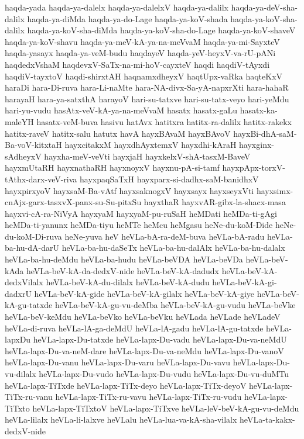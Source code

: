 {haqda-yada
haqda-ya-dalelx
haqda-ya-dalelxV
haqda-ya-dalilx
haqda-ya-deV-sha-dalilx
haqda-ya-diMda
haqda-ya-do-Lage
haqda-ya-koV-shada
haqda-ya-koV-sha-dalilx
haqda-ya-koV-sha-diMda
haqda-ya-koV-sha-do-Lage
haqda-ya-koV-shaveV
haqda-ya-koV-shavu
haqda-ya-meV-kA-ya-na-meVvaM
haqda-ya-mi-SayxteV
haqda-yasayx
haqda-ya-veM-budu
haqdayeV
haqda-yeV-heyxV-va-rU-pANi
haqdedxVshaM
haqdevxV-SaTx-na-mi-hoV-cayxteV
haqdi
haqdiV-tAyxdi
haqdiV-tayxtoV
haqdi-shirxtAH
haqnamxdheyxV
haqtUpx-vaRka
haqteKxV
haraDi
hara-Di-ruva
hara-Li-naMte
hara-NA-divx-Sa-yA-napxrXti
hara-hahaR
harayaH
hara-ya-satxthA
harayoV
hari-su-tatxve
hari-su-tatx-veyo
hari-yeMdu
hari-yu-vudu
hasAtx-veV-kA-ya-na-meVvaM
hasatx
hasatx-gaLu
hasatx-ka-maleYH
hasatx-veM-buva
hasivu
hatAvx
hatitxra
hatitx-ra-dalilx
hatitx-rakekx
hatitx-raveV
hatitx-salu
hatutx
havA
hayxBAvaM
hayxBAvoV
hayxBi-dhA-saM-Ba-voV-kitxtaH
hayxcitakxM
hayxdhAyxtemxV
hayxdhi-kAraH
hayxginx-sAdheyxV
hayxha-meV-veVti
hayxjaH
hayxkelxV-shA-tasxM-BaveV
hayxmUtaRH
hayxnathaRH
hayxnoyxV
hayxnu-pA-si-tamf
hayxpApx-torxV-tAthx-darx-veV-riva
hayxpaqSaTxH
hayxparx-si-dadhx-saM-banidhxV
hayxpirxyoV
hayxsaM-Ba-vAtf
hayxsaknogxV
hayxsayx
hayxseyxVti
hayxsimx-cnAjx-garx-tasxvX-panx-su-Su-pitxSu
hayxthaR
hayxvAR-gibx-la-shacx-masa
hayxvi-cA-ra-NiVyA
hayxyaM
hayxyaM-pu-ruSaH
heMDati
heMDa-ti-gAgi
heMDa-ti-yanunx
heMDa-tiyu
heMTe
heMcu
heMgasu
heNe-du-koM-Dide
heNe-du-koM-Di-ruva
heNe-yuva
heV
heVLa-bA-ra-deM-buva
heVLa-bA-radu
heVLa-ba-hu-dA-darU
heVLa-ba-hu-daSeTx
heVLa-ba-hu-dalAlx
heVLa-ba-hu-dalalx
heVLa-ba-hu-deMdu
heVLa-ba-hudu
heVLa-beVDA
heVLa-beVDa
heVLa-beV-kAda
heVLa-beV-kA-da-dedxV-nide
heVLa-beV-kA-dadudx
heVLa-beV-kA-dedxVilalx
heVLa-beV-kA-du-dilalx
heVLa-beV-kA-dudu
heVLa-beV-kA-gi-dadxrU
heVLa-beV-kA-gide
heVLa-beV-kA-gilalx
heVLa-beV-kA-giye
heVLa-beV-kA-gu-tatxde
heVLa-beV-kA-gu-vu-deMba
heVLa-beV-kA-gu-vudu
heVLa-beVke
heVLa-beV-keMdu
heVLa-beVko
heVLa-beVku
heVLada
heVLade
heVLadeV
heVLa-di-ruva
heVLa-lA-ga-deMdU
heVLa-lA-gadu
heVLa-lA-gu-tatxde
heVLa-lapxDu
heVLa-lapx-Du-tatxde
heVLa-lapx-Du-vadu
heVLa-lapx-Du-va-neMdU
heVLa-lapx-Du-va-neM-dare
heVLa-lapx-Du-va-neMdu
heVLa-lapx-Du-vanoV
heVLa-lapx-Du-vanu
heVLa-lapx-Du-varu
heVLa-lapx-Du-vavu
heVLa-lapx-Du-vu-dilalx
heVLa-lapx-Du-vudo
heVLa-lapx-Du-vudu
heVLa-lapx-Du-vu-duMTu
heVLa-lapx-TiTxde
heVLa-lapx-TiTx-deyo
heVLa-lapx-TiTx-deyoV
heVLa-lapx-TiTx-ru-vanu
heVLa-lapx-TiTx-ru-vavu
heVLa-lapx-TiTx-ru-vudu
heVLa-lapx-TiTxto
heVLa-lapx-TiTxtoV
heVLa-lapx-TiTxve
heVLa-leV-beV-kA-gu-vu-deMdu
heVLa-lilalx
heVLa-li-lalxve
heVLalu
heVLa-lua-va-kA-sha-vilalx
heVLa-ta-kakx-dedxV-nide
}

